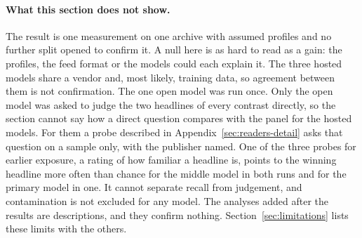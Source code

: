 \paragraph{What this section does not show.} The result is one measurement on one archive with assumed profiles and no further split opened to confirm it. A null here is as hard to read as a gain: the profiles, the feed format or the models could each explain it. The three hosted models share a vendor and, most likely, training data, so agreement between them is not confirmation. The one open model was run once. Only the open model was asked to judge the two headlines of every contrast directly, so the section cannot say how a direct question compares with the panel for the hosted models. For them a probe described in Appendix~\ref{sec:readers-detail} asks that question on a sample only, with the publisher named. One of the three probes for earlier exposure, a rating of how familiar a headline is, points to the winning headline more often than chance for the middle model in both runs and for the primary model in one. It cannot separate recall from judgement, and contamination is not excluded for any model. The analyses added after the results are descriptions, and they confirm nothing. Section~\ref{sec:limitations} lists these limits with the others.
